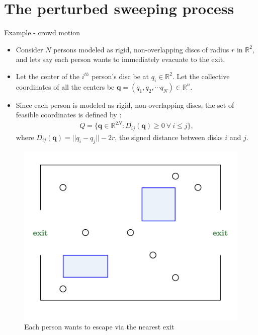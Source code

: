 \documentclass[8pt,aspectratio=169]{beamer}
\begin{document}
\section{The perturbed sweeping process}

\begin{frame}{Example - crowd motion}
    \begin{itemize}
        \item Consider $N$ persons modeled as rigid, non-overlapping discs of radius $r$ in $\mathbb{R}^2$, and lets say each person wants to immediately evacuate to the exit. 
        \item Let the center of the $i^{th}$ person's disc be at $q_i \in \mathbb{R}^2$. Let the collective coordinates of all the centers be $\boldsymbol{q} = (q_1, q_2, \cdots q_N) \in \mathbb{R}^n$.
        \item Since each person is modeled as rigid, non-overlapping discs, the set of feasible coordinates is defined by :
        \begin{align*}
            Q = \{\boldsymbol{q} \in \mathbb{R}^{2N} : D_{ij}(\boldsymbol{q})\geq 0 \ \forall \ i
        \leq j\},
        \end{align*}
        where $D_{ij}(\boldsymbol{q}) = ||q_i - q_j|| - 2r$, the signed distance between disks $i$ and $j$.
    \end{itemize}

    \begin{figure}[h]
        \centering
        \includegraphics[width=0.26\linewidth]{crowd.png}
        \caption{Each person wants to escape via the nearest exit}
        \label{fig:enter-label}
    \end{figure}    
\end{frame}
\end{document}
